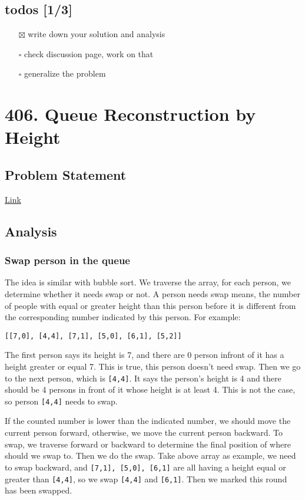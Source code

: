 \documentclass[12pt]{article}
\begin{document}
\subsection{todos [1/3]}
\label{sec:orgefb9dc0}
\begin{itemize}
\item[{$\boxtimes$}] write down your solution and analysis
\item[{$\square$}] check discussion page, work on that
\item[{$\square$}] generalize the problem
\end{itemize}
\section{406. Queue Reconstruction by Height}
\label{sec:org0e01631}
\subsection{Problem Statement}
\label{sec:org8cacca3}
\href{https://leetcode.com/problems/queue-reconstruction-by-height/}{Link}
\subsection{Analysis}
\label{sec:orgea71104}
\subsubsection{Swap person in the queue}
\label{sec:orgeb78e91}
The idea is similar with bubble sort. We traverse the array, for each person, we determine whether it needs swap or not. A person needs swap means, the number of people with equal or greater height than this person before it is different from the corresponding number indicated by this person. For example:
\begin{verbatim}
[[7,0], [4,4], [7,1], [5,0], [6,1], [5,2]]
\end{verbatim}
The first person says its height is 7, and there are 0 person infront of it has a height greater or equal 7. This is true, this person doesn't need swap. Then we go to the next person, which is \texttt{[4,4]}. It says the person's height is 4 and there should be 4 persons in front of it whose height is at least 4. This is not the case, so person \texttt{[4,4]} needs to swap.

If the counted number is lower than the indicated number, we should move the current person forward, otherwise, we move the current person backward. To swap, we traverse forward or backward to determine the final position of where should we swap to. Then we do the swap. Take above array as example, we need to swap backward, and \texttt{[7,1], [5,0], [6,1]} are all having a height equal or greater than \texttt{[4,4]}, so we swap \texttt{[4,4]} and \texttt{[6,1]}. Then we marked this round has been swapped.
\end{document}
